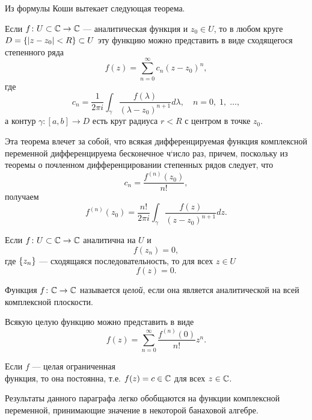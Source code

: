Из формулы Коши вытекает следующая теорема.
\begin{theorem}\label{th:analytic}
    Если $f \colon U \subset \mathbb{C} \to \mathbb{C}$ --- аналитическая функция и $z_0 \in U$,
    то в любом круге $D = \left\{\left|z-z_0\right| < R\right\} \subset U$ эту функцию можно представить в
    виде сходящегося степенного ряда
    \[ f(z) = \sum_{n=0}^\infty c_n (z - z_0)^n, \]
    где 
    \[ c_n = \dfrac{1}{2\pi i} \int_\gamma \dfrac{f(\lambda)}{(\lambda - z_0)^{n+1}} d \lambda,
        \quad n = 0,\; 1,\; \dotsc, \]
    а контур $\gamma \colon [a, b] \to D$ есть круг радиуса $r < R$ с центром в точке $z_0$. 
\end{theorem}

Эта теорема влечет за собой, что всякая дифференцируемая функция комплексной переменной
дифференцируема бесконечное ч`исло раз, причем, поскольку
из теоремы о почленном дифференцировании степенных рядов следует, что
\[ c_n = \frac{f^{(n)}(z_0)}{n!}, \]
получаем
\[ f^{(n)}(z_0) = \dfrac{n!}{2\pi i} 
    \int_\gamma \dfrac{f(z)}{(z - z_0)^{n+1}} d z. \]

\begin{theorem}[единственности]
    Если $f \colon U \subset \mathbb{C} \to \mathbb{C}$ аналитична на $U$ и
    \[ f(z_n) = 0, \]
    где $\left\{z_n\right\}$ --- сходящаяся последовательность, то для всех $z \in U$
    \[ f(z) = 0. \]
\end{theorem}

\begin{definition}
    Функция $f \colon \mathbb{C} \to \mathbb{C}$ называется \emph{целой}, если
    она является аналитической на всей комплексной плоскости.
\end{definition}

Всякую целую функцию можно представить в виде
\[ f(z) = \sum_{n=0}^\infty \frac{f^{(n)}(0)}{n!} z^n. \]

\begin{theorem}[Лиувилля]\label{th:liouville}
    Если $f$ --- целая ограниченная\\функция, то она постоянна, т.е. $f(z) = c \in \mathbb{C}$ для всех $z \in \mathbb{C}$.
\end{theorem}

Результаты данного параграфа легко обобщаются на функции комплексной переменной, принимающие
значение в некоторой банаховой алгебре.

